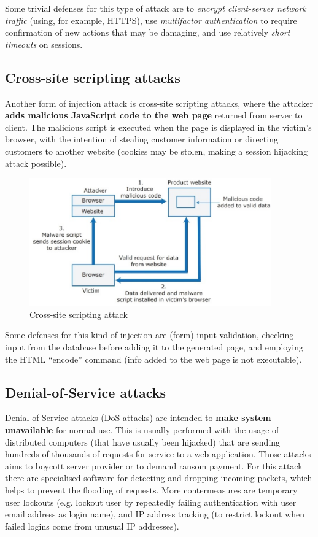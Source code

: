 Some trivial defenses for this type of attack are to \textit{encrypt client-server network traffic} (using, for example, HTTPS), use \textit{multifactor authentication} to require confirmation of new actions that may be damaging, and use relatively \textit{short timeouts} on sessions.

\subsection{Cross-site scripting attacks}

Another form of injection attack is cross-site scripting attacks, where the attacker \textbf{adds malicious JavaScript code to the web page} returned from server to client. The malicious script is executed when the page is displayed in the victim’s browser, with the intention of stealing customer information or directing customers to another website (cookies may be stolen, making a session hijacking attack possible).

\begin{figure} [H]
    \centering
    \includegraphics[width=0.93\textwidth]{images/Security/XSS.png}
    \caption{Cross-site scripting attack}
    \label{fig:XSS}
\end{figure} 

Some defenses for this kind of injection are (form) input validation, checking input from the database before adding it to the generated page, and employing the HTML “encode” command (info added to the web page is not executable).

\subsection{Denial-of-Service attacks}

Denial-of-Service attacks (DoS attacks) are intended to \textbf{make system unavailable} for normal use. This is usually performed with the usage of distributed computers (that have usually been hijacked) that are sending hundreds of thousands of requests for service to a web application. Those attacks aims to boycott server provider or to demand ransom payment. For this attack there are specialised software for detecting and dropping incoming packets, which helps to prevent the flooding of requests. More contermeasures are temporary user lockouts (e.g. lockout user by repeatedly failing authentication with user email address as login name), and IP address tracking (to restrict lockout when failed logins come from unusual IP addresses).

